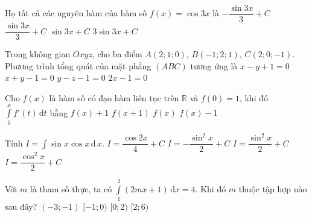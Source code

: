 \begin{ex}%
Họ tất cả các nguyên hàm của hàm số $f(x)=\cos 3x$ là
\choice
{$-\dfrac{\sin 3x}{3}+C$}
{\True $\dfrac{\sin 3x}{3}+C$}
{$\sin 3x+C$}
{$3 \sin 3x+C$}
\end{ex}

\begin{ex}%
Trong không gian $Oxyz$, cho ba điểm $A(2;1;0)$, $B(-1;2;1)$, $C(2;0;-1)$. Phương trình tổng quát của mặt phẳng $(A B C)$ tương ứng là
\choice
{$x-y+1=0$}
{$x+y-1=0$}
{\True $y-z-1=0$}
{$2x-1=0$}
\end{ex}

\begin{ex}%
Cho $f(x)$ là hàm số có đạo hàm liên tục trên $\mathbb{R}$ và $f(0)=1$, khi đó $\displaystyle\int\limits_0^x f'(t)\mathrm{\,d}t$ bằng
\choice
{$f(x)+1$}
{$f(x+1)$}
{$f(x)$}
{\True $f(x)-1$}
\end{ex}

\begin{ex}%
Tính $ I = \displaystyle  \int \sin x \cos x\, \mathrm{d\,} x $.
\choice
{$ I =  \dfrac{\cos 2x}{4} + C $}
{$ I =  - \dfrac{\sin^2 x }{2} + C $}
{\True $ I =  \dfrac{\sin^2 x}{2} + C $}
{$ I =  \dfrac{\cos^2 x}{2} + C $}
\end{ex}

\begin{ex}%
Với $ m $ là tham số thực, ta có $ \displaystyle\int\limits_{1}^{2} (2mx+1)\mathrm{\,d}x =4$. Khi đó $ m $ thuộc tập hợp nào sau đây?
\choice
{$ (-3;-1) $}
{$ [-1;0) $}
{\True $ [0;2) $}
{$ [2;6) $}
\loigiai{
Ta có
\allowdisplaybreaks
\begin{eqnarray*}
&&\displaystyle\int\limits_{1}^{2} (2mx+1)\mathrm{\,d}x =4\\
&\Leftrightarrow&(mx^2+x)\bigg|^{2}_{1}=4\\
&\Leftrightarrow&4m+2-(m+1)=4\\
&\Leftrightarrow&m=1\in[0;2).
\end{eqnarray*}
}
\end{ex}

